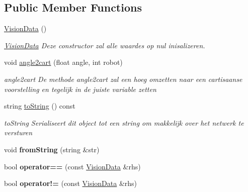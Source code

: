 \subsection*{Public Member Functions}
\begin{DoxyCompactItemize}
\item 
\hypertarget{class_vision_data_a019e9b21b12cb5a6d813551476287a3c}{\hyperlink{class_vision_data_a019e9b21b12cb5a6d813551476287a3c}{Vision\-Data} ()}\label{class_vision_data_a019e9b21b12cb5a6d813551476287a3c}

\begin{DoxyCompactList}\small\item\em \hyperlink{class_vision_data}{Vision\-Data} Deze constructor zal alle waardes op nul inisalizeren. \end{DoxyCompactList}\item 
void \hyperlink{class_vision_data_a0a00c862dc54fa0002e2430529706bef}{angle2cart} (float angle, int robot)
\begin{DoxyCompactList}\small\item\em angle2cart De methode angle2cart zal een hoeg omzetten naar een cartisaanse voorstelling en tegelijk in de juiste variable zetten \end{DoxyCompactList}\item 
\hypertarget{class_vision_data_a1d1b7e638dc2ebc8eb0ec8f9bf9e0500}{string \hyperlink{class_vision_data_a1d1b7e638dc2ebc8eb0ec8f9bf9e0500}{to\-String} () const }\label{class_vision_data_a1d1b7e638dc2ebc8eb0ec8f9bf9e0500}

\begin{DoxyCompactList}\small\item\em to\-String Serialiseert dit object tot een string om makkelijk over het netwerk te versturen \end{DoxyCompactList}\item 
\hypertarget{class_vision_data_af4135c9c4a3db0f8fe183d1397d82e8f}{void {\bfseries from\-String} (string \&str)}\label{class_vision_data_af4135c9c4a3db0f8fe183d1397d82e8f}

\item 
\hypertarget{class_vision_data_a98806619097b613e0a4cd8a1e6f06ce1}{bool {\bfseries operator==} (const \hyperlink{class_vision_data}{Vision\-Data} \&rhs)}\label{class_vision_data_a98806619097b613e0a4cd8a1e6f06ce1}

\item 
\hypertarget{class_vision_data_a18bd10a4b8ccd76a945f50da92b9e417}{bool {\bfseries operator!=} (const \hyperlink{class_vision_data}{Vision\-Data} \&rhs)}\label{class_vision_data_a18bd10a4b8ccd76a945f50da92b9e417}

\end{DoxyCompactItemize}
